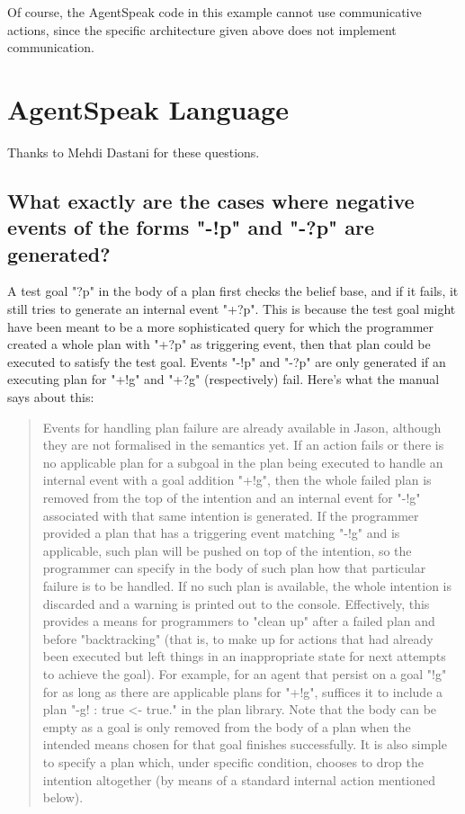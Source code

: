 \documentclass{article}
\begin{document}
\begin{description}
Of course, the AgentSpeak code in this example cannot use communicative
actions, since the specific architecture given above does not implement
communication.

\section{AgentSpeak Language}

Thanks to Mehdi Dastani for these questions.

\subsection{What exactly are the cases where negative events of the forms
  "-!p" and "-?p" are generated?}

A test goal "?p" in the body of a plan first checks the belief base,
and if it fails, it still tries to generate an internal event
"+?p". This is because the test goal might have been meant to be a
more sophisticated query for which the programmer created a whole plan
with "+?p" as triggering event, then that plan could be executed to
satisfy the test goal. Events "-!p" and "-?p" are only generated if an
executing plan for "+!g" and "+?g" (respectively) fail. Here's what
the manual says about this:

\begin{quote}
  Events for handling plan failure are already available in Jason,
  although they are not formalised in the semantics yet. If an action
  fails or there is no applicable plan for a subgoal in the plan being
  executed to handle an internal event with a goal addition "+!g",
  then the whole failed plan is removed from the top of the intention
  and an internal event for "-!g" associated with that same intention
  is generated. If the programmer provided a plan that has a
  triggering event matching "-!g" and is applicable, such plan will be
  pushed on top of the intention, so the programmer can specify in the
  body of such plan how that particular failure is to be handled. If
  no such plan is available, the whole intention is discarded and a
  warning is printed out to the console. Effectively, this provides a
  means for programmers to "clean up" after a failed plan and before
  "backtracking" (that is, to make up for actions that had already
  been executed but left things in an inappropriate state for next
  attempts to achieve the goal). For example, for an agent that
  persist on a goal "!g" for as long as there are applicable plans for
  "+!g", suffices it to include a plan "-g! : true <- true." in the
  plan library. Note that the body can be empty as a goal is only
  removed from the body of a plan when the intended means chosen for
  that goal finishes successfully. It is also simple to specify a plan
  which, under specific condition, chooses to drop the intention
  altogether (by means of a standard internal action mentioned below).
\end{quote}


\end{description}
\end{document}
